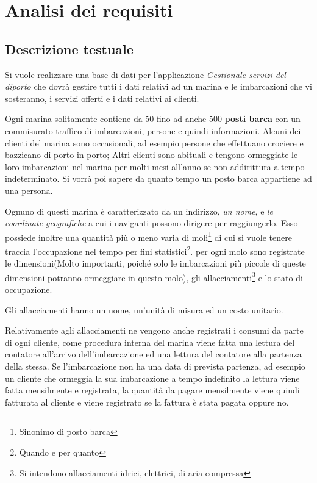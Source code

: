 
\section{Analisi dei requisiti}
\subsection{Descrizione testuale}
Si vuole realizzare una base di dati per l'applicazione \textit{Gestionale servizi del diporto} che dovrà gestire tutti i dati relativi ad un marina e le imbarcazioni che vi sosteranno, i servizi offerti e i dati relativi ai clienti.

Ogni marina solitamente contiene da 50 fino ad anche 500 \textbf{posti barca} con un commisurato traffico di imbarcazioni, persone e quindi informazioni. Alcuni dei clienti del marina sono occasionali, ad esempio persone che effettuano crociere e bazzicano di porto in porto; Altri clienti sono abituali e tengono ormeggiate le loro imbarcazioni nel marina per molti mesi all'anno se non addirittura a tempo indeterminato. Si vorrà poi sapere da quanto tempo un posto barca appartiene ad una persona.

Ognuno di questi marina è caratterizzato da un indirizzo, \textit{un nome}, e \textit{le coordinate geografiche} a cui i naviganti possono dirigere per raggiungerlo. Esso possiede inoltre una quantità più o meno varia di moli\footnote{Sinonimo di posto barca} di cui si vuole tenere traccia l'occupazione nel tempo per fini statistici\footnote{Quando e per quanto}. per ogni molo sono registrate le dimensioni(Molto importanti, poiché solo le imbarcazioni più piccole di queste dimensioni potranno ormeggiare in questo molo), gli allacciamenti\footnote{Si intendono allacciamenti idrici, elettrici, di aria compressa} e lo stato di occupazione.

Gli allacciamenti hanno un nome, un'unità di misura ed un costo unitario.

Relativamente agli allacciamenti ne vengono anche registrati i consumi da parte di ogni cliente, come procedura interna del marina viene fatta una lettura del contatore all'arrivo dell'imbarcazione ed una lettura del contatore alla partenza della stessa. Se l'imbarcazione non ha una data di prevista partenza, ad esempio un cliente che ormeggia la sua imbarcazione a tempo indefinito la lettura viene fatta mensilmente e registrata, la quantità da pagare mensilmente viene quindi fatturata al cliente e viene registrato se la fattura è stata pagata oppure no.

